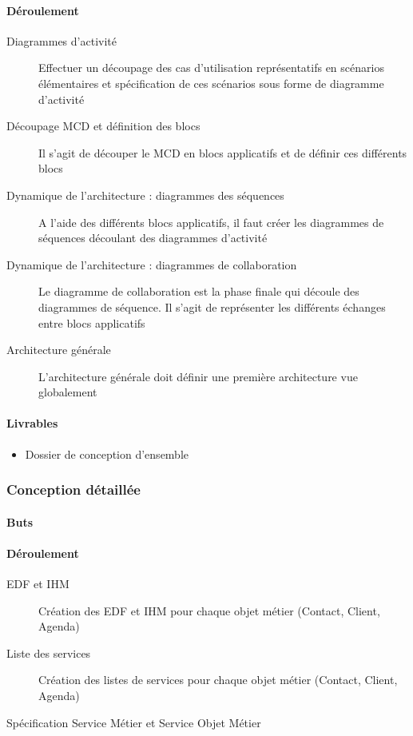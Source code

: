 \paragraph{Déroulement}
\begin{description}
    \item[Diagrammes d'activité]{
        Effectuer un découpage des cas d'utilisation représentatifs en scénarios élémentaires et spécification de ces scénarios sous forme de diagramme d'activité
    }

    \item[Découpage MCD et définition des blocs]{   
		Il s'agit de découper le MCD en blocs applicatifs et de définir ces différents blocs}

    \item[Dynamique de l'architecture : diagrammes des séquences]{
		A l'aide des différents blocs applicatifs, il faut créer les diagrammes de séquences découlant des diagrammes d'activité}
	\item[Dynamique de l'architecture : diagrammes de collaboration]{
		Le diagramme de collaboration est la phase finale qui découle des diagrammes de séquence. Il s'agit de représenter les différents échanges entre blocs applicatifs}
	\item[Architecture générale]{
		L'architecture générale doit définir une première architecture vue globalement}
	
\end{description}

\paragraph{Livrables}
\begin{itemize}
    \item Dossier de conception d'ensemble
\end{itemize}

\subsubsection{Conception détaillée}

\paragraph{Buts}



\paragraph{Déroulement}
\begin{description}
    \item[EDF et IHM]{
        Création des EDF et IHM pour chaque objet métier (Contact, Client, Agenda)
    }
	\item[Liste des services]{
        Création des listes de services pour chaque objet métier (Contact, Client, Agenda)
    }
	\item[Spécification Service Métier et Service Objet Métier]{
    }
\end{description}

